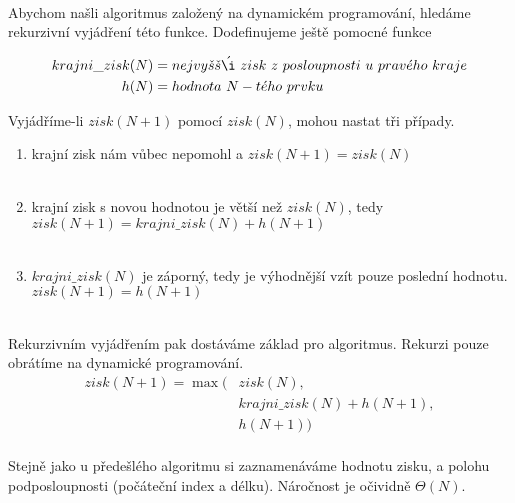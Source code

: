 \documentclass[11pt]{article}
\begin{document}
\setlength{\unitlength}{.6mm}
 \\

\vspace{1cm}

Abychom našli algoritmus založený na dynamickém programování, hledáme rekurzivní
vyjádření této funkce. Dodefinujeme ještě pomocné funkce

\begin{align*}
krajni\_zisk(N) &= nejvy\check{s}\check{s}\acute{\i}\ zisk\ z\ 
posloupnosti\ u\ prav\acute{e}ho\ kraje \\
h(N) &= hodnota\ N-t\acute{e}ho\ prvku
\end{align*}


\mbox{}
\vspace{1cm}

\clearpage
Vyjádříme-li $zisk(N + 1)$ pomocí $zisk(N)$, mohou nastat tři případy.
\begin{enumerate}
\item krajní zisk nám vůbec nepomohl a $zisk(N + 1) = zisk(N)$ \\
 \\

\item krajní zisk s novou hodnotou je větší než $zisk(N)$, tedy \\
	$zisk(N + 1) = krajni\_zisk(N) + h(N + 1)$ \\
 \\

\item $krajni\_zisk(N)$ je záporný, tedy je výhodnější vzít pouze 
	poslední hodnotu. \\
	$zisk(N + 1) = h(N + 1)$ \\
 \\

\end{enumerate} 

\vspace{1cm}

Rekurzivním vyjádřením pak dostáváme základ pro algoritmus. Rekurzi pouze 
obrátíme na dynamické programování.
\begin{align*}
zisk(N + 1) = \max (&zisk(N), \\
&krajni\_zisk(N) + h(N + 1), \\
&h(N + 1)) \\
\end{align*}

Stejně jako u předešlého algoritmu si zaznamenáváme hodnotu zisku, a polohu
podposloupnosti (počáteční index a délku). Náročnost je očividně $\Theta(N)$.

\end{document}
